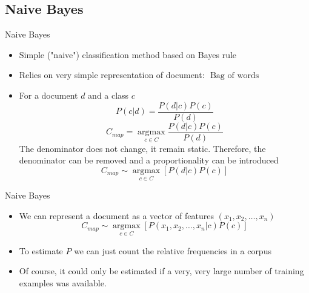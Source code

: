 \documentclass[11pt]{beamer}
\newcommand{\highlight}[1]{%
  \colorbox{yellow!100}{$\displaystyle#1$}}
\begin{document}
\subsection{Naive Bayes \\ \scalebox{0.8}{}}
\begin{frame}{Naive Bayes}
\begin{itemize}
\item Simple ("naive") classification method based on Bayes rule
\item Relies on very simple representation of document: \highlight{\text{ 
Bag of words}}
\item For a document $d$ and a class $c$
\begin{equation}
P(c \vert d) = \frac{P(d \vert c) P(c)}{P(d)}
\end{equation}
\begin{equation}
C_{map} = \underset{c \in C}{\operatorname{argmax}}\frac{P(d \vert c) P(c)}{P(d)} 
\end{equation}
The denominator does not change, it remain static. Therefore, the denominator can be removed and a proportionality can be introduced
\begin{equation}
C_{map} \sim \underset{c \in C}{\operatorname{argmax}}\left[P(d \vert c) P(c)\right]
\end{equation}
\end{itemize}
\end{frame}
\begin{frame}{Naive Bayes}
\begin{itemize}
\item We can represent a document as a vector of features $(x_1, x_2, \dots, x_n)$
\begin{equation}
C_{map} \sim \underset{c \in C}{\operatorname{argmax}}\left[P(x_1, x_2, \dots, x_n \vert c) P(c)\right]
\end{equation}
\item To estimate $P$ we can just count the relative frequencies in a corpus
\item Of course, it could only be estimated if a very, very large number of training examples was available.

\end{itemize}
\end{frame}
\end{document}
